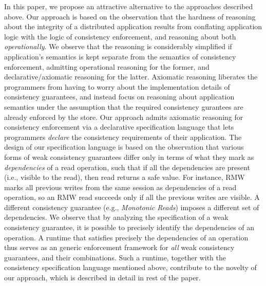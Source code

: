 In this paper, we propose an attractive alternative to the approaches
described above. Our approach is based on the observation that the
hardness of reasoning about the integrity of a distributed application
results from conflating application logic with the logic of
consistency enforcement, and reasoning about both
\emph{operationally}.  We observe that the reasoning is considerably
simplified if application's semantics is kept separate from the
semantics of consistency enforcement, admitting operational reasoning
for the former, and declarative/axiomatic reasoning for the latter.
Axiomatic reasoning liberates the programmers from having to worry
about the implementation details of consistency guarantees, and
instead focus on reasoning about application semantics under the
assumption that the required consistency gurantees are already
enforced by the store. Our approach admits axiomatic reasoning for
consistency enforcement via a declarative specification language that
lets programmers \emph{declare} the consistency requirements of their
application. The design of our specification language is based on the
observation that various forms of weak consistency guarantees differ
only in terms of what they mark as \emph{dependencies} of a read
operation, such that if all the dependencies are present (i.e.,
visible to the read), then read returns a safe value.  For instance,
RMW marks all previous writes from the same session as dependencies of
a read operation, so an RMW read succeeds only if all the previous
writes are visible. A different consistency guarantee (e.g.,
\emph{Monotonic Reads}) imposes a different set of dependencies. We
observe that by analyzing the specification of a weak consistency
guarantee, it is possible to precisely identify the dependencies of an
operation. A runtime that satisfies precisely the dependencies of an
operation thus serves as an generic enforcement framework for
\emph{all} weak consistency guarantees, and their combinations. Such a
runtime, together with the consistency specification language
mentioned above, contribute to the novelty of our approach, which is
described in detail in rest of the paper.
